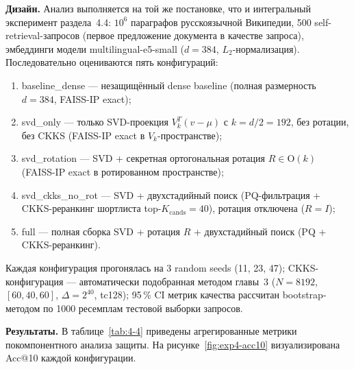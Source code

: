 \documentclass[a4paper, 12pt, oneside, openany]{article}
\begin{document}
\textbf{Дизайн.} Анализ выполняется на той же постановке, что и интегральный эксперимент раздела~4.4: $10^6$ параграфов русскоязычной Википедии, 500 self-retrieval-запросов (первое предложение документа в качестве запроса), эмбеддинги модели multilingual-e5-small ($d = 384$, $L_2$-нормализация). Последовательно оцениваются пять конфигураций:
\begin{enumerate}
	\def\labelenumi{\arabic{enumi}.}
	\item baseline\_dense --- незащищённый dense baseline (полная размерность $d = 384$, FAISS-IP exact);
	\item svd\_only --- только SVD-проекция $V_{k}^{T}(v - \mu)$ с $k = d/2 = 192$, без ротации, без CKKS (FAISS-IP exact в $V_k$-про\-стран\-стве);
	\item svd\_rotation --- SVD + секретная ортогональная ротация $R \in \mathrm{O}(k)$ (FAISS-IP exact в ротированном пространстве);
	\item svd\_ckks\_no\_rot --- SVD + двухстадийный поиск (PQ-фильтрация + CKKS-реранкинг шортлиста top-$K_{\mathrm{cands}} = 40$), ротация отключена ($R = I$);
	\item full --- полная сборка SVD + ротация $R$ + двухстадийный поиск (PQ + CKKS-реранкинг).
\end{enumerate}

Каждая конфигурация прогонялась на 3 random seeds (11, 23, 47); CKKS-кон\-фи\-гу\-ра\-ция --- автоматически подобранная методом главы~3 ($N = 8192$, $[60, 40, 60]$, $\Delta = 2^{40}$, tc128); 95\,\% CI метрик качества рассчитан bootstrap-методом по 1000 ресемплам тестовой выборки запросов.

\textbf{Результаты.} В таблице~\ref{tab:4-4} приведены агрегированные метрики покомпонентного анализа защиты. На рисунке~\ref{fig:exp4-acc10} визуализирована Acc@10 каждой конфигурации.
\end{document}
